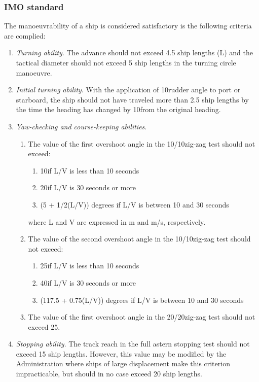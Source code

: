\subsubsection{IMO standard}
The manoeuvrability of a ship is considered satisfactory is the following criteria are complied:
\begin{enumerate}
	\item \emph{Turning ability}. The advance should not exceed 4.5 ship lengths (L) and the tactical diameter should not exceed 5 ship lengths in the turning circle manoeuvre.
	\item \emph{Initial turning ability}. With the application of 10\degree rudder angle to port or starboard, the ship should not have traveled more than 2.5 ship lengths by the time the heading has changed by 10\degree from the original heading. 
	\item \emph{Yaw-checking and course-keeping abilities}. 
	\begin{enumerate}
		\item The value of the first overshoot angle in the 10\degree/10\degree zig-zag test should not exceed: 
		\begin{enumerate}
			\item 10\degree if L/V is less than 10 seconds
			\item 20\degree if L/V is 30 seconds or more
			\item (5 + 1/2(L/V)) degrees if L/V is between 10 and 30 seconds
		\end{enumerate}
		where L and V are expressed in m and m/s, respectively.
		\item The value of the second overshoot angle in the 10\degree/10\degree zig-zag test should not exceed:
		\begin{enumerate}
			\item 25\degree if L/V is less than 10 seconds
			\item 40\degree if L/V is 30 seconds or more
			\item (117.5 + 0.75(L/V)) degrees if L/V is between 10 and 30 seconds
		\end{enumerate}
		\item The value of the first overshoot angle in the 20\degree/20\degree zig-zag test should not exceed 25\degree. 
	\end{enumerate}
	\item \emph{Stopping ability}. The track reach in the full astern stopping test should not exceed 15 ship lengths. However, this value may be modified by the Administration where ships of large displacement make this criterion impracticable, but should in no case exceed	20 ship lengths. 
\end{enumerate}


